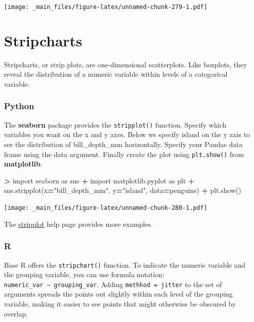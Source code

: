 \documentclass[
]{book}
\newenvironment{Shaded}{\begin{snugshade}}{\end{snugshade}}
\newcommand{\ImportTok}[1]{#1}
\newcommand{\NormalTok}[1]{#1}
\newcommand{\OperatorTok}[1]{\textcolor[rgb]{0.81,0.36,0.00}{\textbf{#1}}}
\newcommand{\StringTok}[1]{\textcolor[rgb]{0.31,0.60,0.02}{#1}}
\begin{document}
\texttt{[image: \_main\_files/figure-latex/unnamed-chunk-279-1.pdf]}

\hypertarget{stripcharts}{%
\section{Stripcharts}\label{stripcharts}}

Stripcharts, or strip plots, are one-dimensional scatterplots. Like boxplots, they reveal the distribution of a numeric variable within levels of a categorical variable.

\hypertarget{python-44}{%
\subsubsection*{Python}\label{python-44}}

The \textbf{seaborn} package provides the \texttt{stripplot()} function. Specify which variables you want on the x and y axes. Below we specify island on the y axis to see the distribution of bill\_depth\_mm horizontally. Specify your Pandas data frame using the data argument. Finally create the plot using \texttt{plt.show()} from \textbf{matplotlib}.

\begin{Shaded}
\begin{Highlighting}[]
\OperatorTok{\textgreater{}} \ImportTok{import}\NormalTok{ seaborn }\ImportTok{as}\NormalTok{ sns}
\OperatorTok{+} \ImportTok{import}\NormalTok{ matplotlib.pyplot }\ImportTok{as}\NormalTok{ plt}
\OperatorTok{+}\NormalTok{ sns.stripplot(x}\OperatorTok{=}\StringTok{"bill\_depth\_mm"}\NormalTok{, y}\OperatorTok{=}\StringTok{"island"}\NormalTok{, data}\OperatorTok{=}\NormalTok{penguins)}
\OperatorTok{+}\NormalTok{ plt.show()}
\end{Highlighting}
\end{Shaded}

\texttt{[image: \_main\_files/figure-latex/unnamed-chunk-280-1.pdf]}

The \href{https://seaborn.pydata.org/generated/seaborn.stripplot.html}{stripplot} help page provides more examples.

\hypertarget{r-44}{%
\subsubsection*{R}\label{r-44}}

Base R offers the \texttt{stripchart()} function. To indicate the numeric variable and the grouping variable, you can use formula notation: \texttt{numeric\_var\ \textasciitilde{}\ grouping\_var}. Adding \texttt{methhod\ =\ \textquotesingle{}jitter\textquotesingle{}} to the set of arguments spreads the points out slightly within each level of the grouping variable, making it easier to see points that might otherwise be obscured by overlap.
\end{document}
